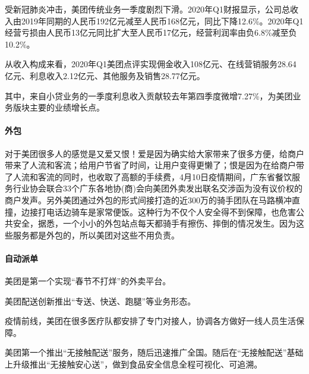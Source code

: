 \documentclass[letterpaper,11pt,english]{sphinxmanual}
\begin{document}
受新冠肺炎冲击，美团传统业务一季度剧烈下滑。2020年Q1财报显示，公司总收入由2019年同期的人民币192亿元减至人民币168亿元，同比下降12.6\%。2020年Q1经营亏损由人民币13亿元同比扩大至人民币17亿元，经营利润率由负6.8\%减至负10.2\%。

从收入构成来看，2020年Q1美团点评实现佣金收入108亿元、在线营销服务28.64亿元、利息收入2.12亿元、其他服务及销售28.77亿元。

其中，来自小贷业务的一季度利息收入贡献较去年第四季度微增7.27\%，为美团业务版块主要的业绩增长点。%
\begin{footnote}[927]\sphinxAtStartFootnote
{}
%
\end{footnote}


\paragraph{外包}
\label{\detokenize{chapter_company/meituan:id21}}
对于美团很多人的感觉是又爱又恨！爱是因为确实给大家带来了很多方便，给商户带来了人流和客流；给用户节省了时间，让用户变得更懒了；恨是因为在给商户带了人流和客流的同时，也收取了高额的手续费，4月10日疫情期间，广东省餐饮服务行业协会联合33个广东各地协(商)会向美团外卖发出联名交涉函为没有议价权的商户发声。另外美团通过外包的形式间接打造的近300万的骑手团队在马路横冲直撞，边接打电话边骑车是家常便饭。这种行为不仅个人安全得不到保障，也危害公共安全，据悉，一个小小的外包站点每天都骑手有擦伤、摔倒的情况发生。因为这些服务都是外包的，所以美团对这些不用负责。%
\begin{footnote}[928]\sphinxAtStartFootnote
{}
%
\end{footnote}


\paragraph{自动派单}
\label{\detokenize{chapter_company/meituan:id22}}
美团是第一个实现“春节不打烊”的外卖平台。

美团配送创新推出“专送、快送、跑腿”等业务形态。

疫情前线，美团在很多医疗队都安排了专门对接人，协调各方做好一线人员生活保障。

美团第一个推出“无接触配送”服务，随后迅速推广全国。随后在“无接触配送”基础上升级推出“无接触安心送”，做到食品安全信息全程可视化、可追溯。
\end{document}
